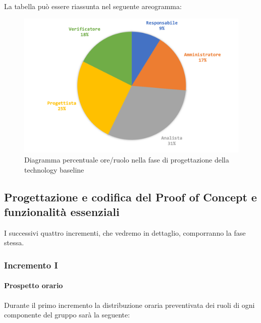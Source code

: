 		La tabella può essere riassunta nel seguente areogramma:
		\begin{figure}[H]
			\centering
			\includegraphics[width=0.8\linewidth]{./images/preventivo/progArch2.png}
			\caption{Diagramma percentuale ore/ruolo nella fase di progettazione della technology baseline}
			\label{fig:diagramma costi ruolo fase progettazione della technology baseline}
		\end{figure}
	
	\subsection{Progettazione e codifica del Proof of Concept e funzionalità essenziali}
	I successivi quattro incrementi, che vedremo in dettaglio, comporranno la fase stessa.  
		\subsubsection{Incremento I}
			\paragraph{Prospetto orario}
			Durante il primo incremento la distribuzione oraria preventivata dei ruoli di ogni componente del gruppo sarà la seguente:
			
